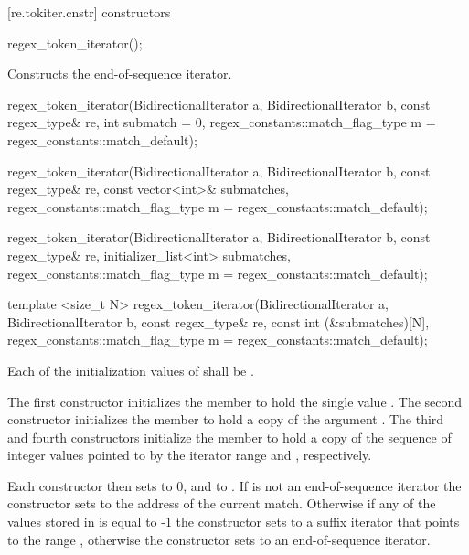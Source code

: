 [re.tokiter.cnstr]{ constructors}

%
\begin{itemdecl}
regex_token_iterator();
\end{itemdecl}

\begin{itemdescr}
\pnum
\effects  Constructs the end-of-sequence iterator.
\end{itemdescr}

%
\begin{itemdecl}
regex_token_iterator(BidirectionalIterator a, BidirectionalIterator b,
                    const regex_type& re,
                    int submatch = 0,
                    regex_constants::match_flag_type m =
                     regex_constants::match_default);

regex_token_iterator(BidirectionalIterator a, BidirectionalIterator b,
                    const regex_type& re,
                    const vector<int>& submatches,
                    regex_constants::match_flag_type m =
                     regex_constants::match_default);

regex_token_iterator(BidirectionalIterator a, BidirectionalIterator b,
                    const regex_type& re,
                    initializer_list<int> submatches,
                    regex_constants::match_flag_type m =
                      regex_constants::match_default);

template <size_t N>
  regex_token_iterator(BidirectionalIterator a, BidirectionalIterator b,
                    const regex_type& re,
                    const int (&submatches)[N],
                    regex_constants::match_flag_type m =
                     regex_constants::match_default);
\end{itemdecl}

\begin{itemdescr}
\pnum
\requires Each of the initialization values of  shall be .

\pnum
\effects The first constructor initializes the member  to hold the single
value . The second constructor initializes the member  to
hold a copy of the argument . The third and fourth constructors
initialize the member  to hold a copy of the sequence of integer values
pointed to by the iterator range  and
, respectively.

\pnum
Each constructor then sets  to 0, and  to
. If  is not an
end-of-sequence iterator the constructor sets  to the
address of the current match. Otherwise if any of the values stored
in  is equal to -1 the constructor sets  to a suffix
iterator that points to the range , otherwise the constructor
sets  to an end-of-sequence iterator.
\end{itemdescr}

